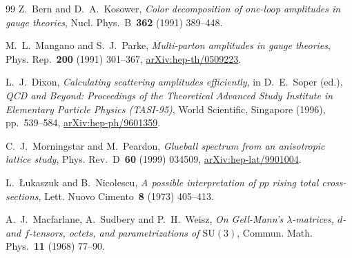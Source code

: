\documentclass[UTF8,a4paper,11pt,fontset=fandol]{ctexart}
\theoremstyle{cplain}
\theoremstyle{cdefinition}
\theoremstyle{cremark}
\numberwithin{equation}{section}
\begin{document}
\begin{thebibliography}{99}
Z.~Bern and D.~A.~Kosower, \emph{Color decomposition of one-loop amplitudes in gauge theories}, Nucl. Phys.~B~\textbf{362} (1991) \mbox{389--448}.

M.~L.~Mangano and S.~J.~Parke, \emph{Multi-parton amplitudes in gauge theories}, Phys. Rep.~\textbf{200} (1991) \mbox{301--367}, \href{https://arxiv.org/abs/hep-th/0509223}{arXiv:hep-th/0509223}.

L.~J.~Dixon, \emph{Calculating scattering amplitudes efficiently}, in D.~E.~Soper (ed.), \emph{QCD and Beyond: Proceedings of the Theoretical Advanced Study Institute in Elementary Particle Physics (TASI-95)}, World Scientific, Singapore (1996), pp.~\mbox{539--584}, \href{https://arxiv.org/abs/hep-ph/9601359}{arXiv:hep-ph/9601359}.

C.~J.~Morningstar and M.~Peardon, \emph{Glueball spectrum from an anisotropic lattice study}, Phys. Rev.~D~\textbf{60} (1999) \mbox{034509}, \href{https://arxiv.org/abs/hep-lat/9901004}{arXiv:hep-lat/9901004}.

L.~Łukaszuk and B.~Nicolescu, \emph{A possible interpretation of $pp$ rising total cross-sections}, Lett. Nuovo Cimento~\textbf{8} (1973) \mbox{405--413}.

A.~J.~Macfarlane, A.~Sudbery and P.~H.~Weisz, \emph{On Gell-Mann's $\lambda$-matrices, $d$- and $f$-tensors, octets, and parametrizations of $\mathrm{SU}(3)$}, Commun. Math. Phys.~\textbf{11} (1968) \mbox{77--90}.

\end{thebibliography}
\end{document}
